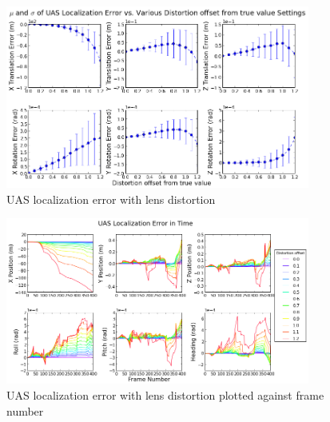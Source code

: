 \message{ !name(thesis.tex)}\documentclass[12pt,letterpaper]{report}
\begin{document}
\begin{figure}[h]
  \centering
  \includegraphics[width=10cm,keepaspectratio=true]{./Figures/SimulationFigures/Figure47.png}
  \caption{UAS localization error with lens distortion}
  \label{fig:simfig47}
\end{figure}

\begin{figure}[h]
  \centering
  \includegraphics[width=10cm,keepaspectratio=true]{./Figures/SimulationFigures/Figure48.png}
  \caption{UAS localization error with lens distortion plotted against frame number}
  \label{fig:simfig48}
\end{figure}







\end{document}
